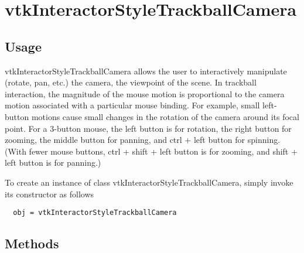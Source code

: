 \section{vtkInteractorStyleTrackballCamera}

\subsection{Usage}

 vtkInteractorStyleTrackballCamera allows the user to interactively
 manipulate (rotate, pan, etc.) the camera, the viewpoint of the scene.  In
 trackball interaction, the magnitude of the mouse motion is proportional
 to the camera motion associated with a particular mouse binding. For
 example, small left-button motions cause small changes in the rotation of
 the camera around its focal point. For a 3-button mouse, the left button
 is for rotation, the right button for zooming, the middle button for
 panning, and ctrl + left button for spinning.  (With fewer mouse buttons,
 ctrl + shift + left button is for zooming, and shift + left button is for
 panning.)

To create an instance of class vtkInteractorStyleTrackballCamera, simply
invoke its constructor as follows
\begin{verbatim}
  obj = vtkInteractorStyleTrackballCamera
\end{verbatim}
\subsection{Methods}

